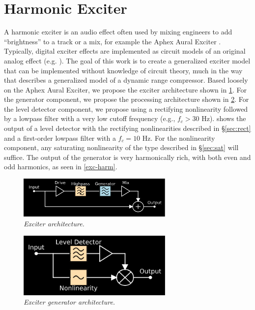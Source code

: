 \documentclass[twoside,a4paper]{article}
\begin{document}
\section{Harmonic Exciter} \label{sec:exciter}
%
A harmonic exciter is an audio effect often used by mixing
engineers to add ``brightness'' to a track or a mix, for example
the Aphex Aural Exciter \cite{aphex}. Typically, digital exciter effects
are implemented as circuit models of an original analog effect (e.g.
\cite{exciter-model}). The goal of this work is to create a
generalized exciter model that can be implemented without knowledge of
circuit theory, much in the way that \cite{giannoulis2012digital} describes
a generalized model of a dynamic range compressor.
\newline\newline
Based loosely on the Aphex Aural Exciter, we propose the
exciter architecture shown in \cref{exc}. For the generator
component, we propose the processing architecture shown in
\cref{gen}.
\newline\newline
For the level detector component, we propose using a rectifying
nonlinearity followed by a lowpass filter with a very low cutoff frequency
(e.g., $f_c > 30 \text{ Hz}$).  shows the
output of a level detector with the rectifying nonlinearities described
in \S\ref{sec:rect} and a first-order lowpass filter with a $f_c = 10
\text{ Hz}$. For the nonlinearity component, any saturating
nonlinearity of the type described in \S\ref{sec:sat} will suffice. The
output of the generator is very harmonically rich, with both even and odd
harmonics, as seen in \cref{exc-harm}.
\newline\newline
%
\begin{figure}[!htb]
    \center
    \includegraphics[width=3in]{../Exciter/Pics/Exciter_FullArch.png}
    \caption{\label{exc}{\it Exciter architecture.}}
\end{figure}
%
\begin{figure}[!htb]
    \center
    \includegraphics[width=3in]{../Exciter/Pics/Exciter_Arch.png}
    \caption{\label{gen}{\it Exciter generator architecture.}}
\end{figure}
\end{document}

